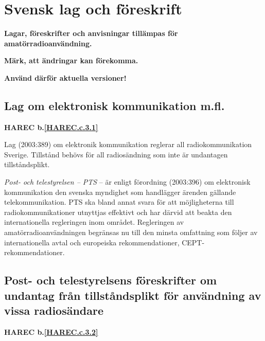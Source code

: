 \section{Svensk lag och föreskrift}

\textbf{Lagar, föreskrifter och anvisningar tillämpas för
  amatörradioanvändning.}

\textbf{Märk, att ändringar kan förekomma.}

\textbf{Använd därför aktuella versioner!}


\subsection{Lag om elektronisk kommunikation m.fl.}
\textbf{
HAREC b.\ref{HAREC.c.3.1}\label{myHAREC.c.3.1}
}

Lag (2003:389) om elektronik kommunikation reglerar all radiokommunikation
Sverige.
Tillstånd behövs för all radiosändning som inte är undantagen tillståndsplikt.

\emph{Post- och telestyrelsen -- PTS} -- är enligt förordning (2003:396) om
elektronisk kommunikation den svenska myndighet som handlägger
ärenden gällande telekommunikation.
PTS ska bland annat svara för att möjligheterna till radiokommunikationer
utnyttjas effektivt och har därvid att beakta den internationella regleringen
inom området.
Regleringen av amatörradioanvändningen begränsas nu till den minsta omfattning
som följer av internationella avtal och europeiska rekommendationer,
CEPT-rekommendationer.

\subsection{Post- och telestyrelsens föreskrifter om undantag från tillståndsplikt för användning av vissa radiosändare}
\textbf{
HAREC b.\ref{HAREC.c.3.2}\label{myHAREC.c.3.2}
}

